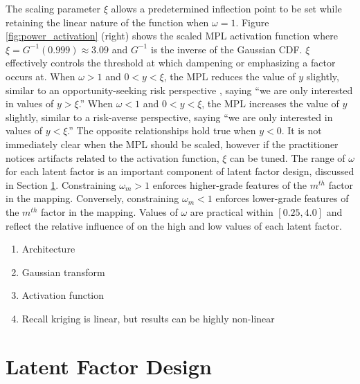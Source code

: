 The scaling parameter $\xi$ allows a predetermined inflection point to be set while retaining the linear nature of the function when $\omega = 1$. Figure \ref{fig:power_activation} (right) shows the scaled \gls{MPL} activation function where $\xi = G^{-1}(0.999) \approx 3.09$ and $G^{-1}$ is the inverse of the Gaussian \gls{CDF}. $\xi$ effectively controls the threshold at which dampening or emphasizing a factor occurs at. When $\omega > 1$ and $0 < y < \xi$, the \gls{MPL} reduces the value of $y$ slightly, similar to an opportunity-seeking risk perspective \citep{eidsvik2015value}, saying ``we are only interested in values of $y > \xi$.'' When $\omega < 1$ and $0 < y < \xi$, the \gls{MPL} increases the value of $y$ slightly, similar to a risk-averse perspective, saying ``we are only interested in values of $y < \xi$.'' The opposite relationships hold true when $y < 0$. It is not immediately clear when the \gls{MPL} should be scaled, however if the practitioner notices artifacts related to the activation function, $\xi$ can be tuned. The range of $\omega$ for each latent factor is an important component of latent factor design, discussed in Section \ref{sec:04factord}. Constraining $\omega_{m} > 1$ enforces higher-grade features of the $m^{th}$ factor in the mapping. Conversely, constraining $\omega_{m} < 1$ enforces lower-grade features of the $m^{th}$ factor in the mapping. Values of $\omega$ are practical within $[0.25, 4.0]$ and reflect the relative influence of on the high and low values of each latent factor.

\begin{enumerate}[noitemsep]
    \item Architecture
    \item Gaussian transform
    \item Activation function
    \item Recall kriging is linear, but results can be highly non-linear
\end{enumerate}


\FloatBarrier
\section{Latent Factor Design}
\label{sec:04factord}


